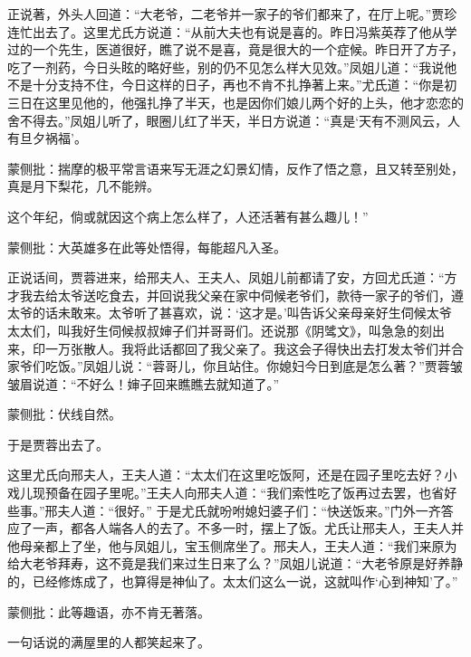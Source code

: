 \begin{parag}
    正说著，外头人回道：“大老爷，二老爷并一家子的爷们都来了，在厅上呢。”贾珍连忙出去了。这里尤氏方说道：“从前大夫也有说是喜的。昨日冯紫英荐了他从学过的一个先生，医道很好，瞧了说不是喜，竟是很大的一个症候。昨日开了方子，吃了一剂药，今日头眩的略好些，别的仍不见怎么样大见效。”凤姐儿道：“我说他不是十分支持不住，今日这样的日子，再也不肯不扎挣著上来。”尤氏道：“你是初三日在这里见他的，他强扎挣了半天，也是因你们娘儿两个好的上头，他才恋恋的舍不得去。”凤姐儿听了，眼圈儿红了半天，半日方说道：“真是‘天有不测风云，人有旦夕祸福’。\begin{note}蒙侧批：揣摩的极平常言语来写无涯之幻景幻情，反作了悟之意，且又转至别处，真是月下梨花，几不能辨。\end{note}这个年纪，倘或就因这个病上怎么样了，人还活著有甚么趣儿！”\begin{note}蒙侧批：大英雄多在此等处悟得，每能超凡入圣。\end{note}正说话间，贾蓉进来，给邢夫人、王夫人、凤姐儿前都请了安，方回尤氏道：“方才我去给太爷送吃食去，并回说我父亲在家中伺候老爷们，款待一家子的爷们，遵太爷的话未敢来。太爷听了甚喜欢，说：‘这才是。’叫告诉父亲母亲好生伺候太爷太太们，叫我好生伺候叔叔婶子们并哥哥们。还说那《阴骘文》，叫急急的刻出来，印一万张散人。我将此话都回了我父亲了。我这会子得快出去打发太爷们并合家爷们吃饭。”凤姐儿说：“蓉哥儿，你且站住。你媳妇今日到底是怎么著？”贾蓉皱皱眉说道：“不好么！婶子回来瞧瞧去就知道了。”\begin{note}蒙侧批：伏线自然。\end{note}于是贾蓉出去了。
\end{parag}


\begin{parag}
    这里尤氏向邢夫人，王夫人道：“太太们在这里吃饭阿，还是在园子里吃去好？小戏儿现预备在园子里呢。”王夫人向邢夫人道：“我们索性吃了饭再过去罢，也省好些事。”邢夫人道：“很好。” 于是尤氏就吩咐媳妇婆子们：“快送饭来。”门外一齐答应了一声，都各人端各人的去了。不多一时，摆上了饭。尤氏让邢夫人，王夫人并他母亲都上了坐，他与凤姐儿，宝玉侧席坐了。邢夫人，王夫人道：“我们来原为给大老爷拜寿，这不竟是我们来过生日来了么？”凤姐儿说道：“大老爷原是好养静的，已经修炼成了，也算得是神仙了。太太们这么一说，这就叫作‘心到神知’了。”\begin{note}蒙侧批：此等趣语，亦不肯无著落。\end{note}一句话说的满屋里的人都笑起来了。
\end{parag}


